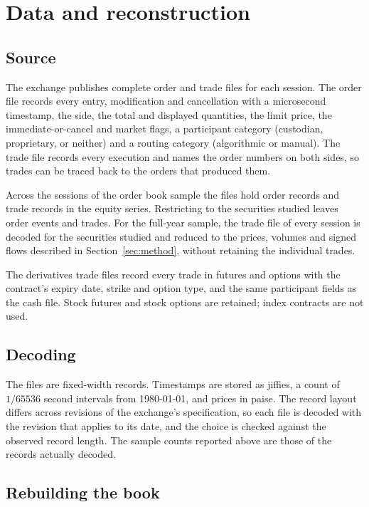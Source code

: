 \section{Data and reconstruction}\label{sec:data}

\subsection{Source}

The exchange publishes complete order and trade files for each session. The order file
records every entry, modification and cancellation with a microsecond timestamp, the side,
the total and displayed quantities, the limit price, the immediate-or-cancel and market
flags, a participant category (custodian, proprietary, or neither) and a routing category
(algorithmic or manual). The trade file records every execution and names the order numbers
on both sides, so trades can be traced back to the orders that produced them.

Across the \SampleSessionsParsed{} sessions of the order book sample the files hold
\SampleOrderEventsRead{} order records and \SampleTradesRead{} trade records in the equity
series. Restricting to the securities studied leaves \SampleOrderEvents{} order events and
\SampleTrades{} trades. For the full-year sample, the trade file of every session is decoded
for the securities studied and reduced to the prices, volumes and signed flows described in
Section~\ref{sec:method}, without retaining the individual trades.

The derivatives trade files record every trade in futures and options with the contract's
expiry date, strike and option type, and the same participant fields as the cash file. Stock
futures and stock options are retained; index contracts are not used.

\subsection{Decoding}

The files are fixed-width records. Timestamps are stored as jiffies, a count of $1/65536$ second
intervals from 1980-01-01, and prices in paise. The record layout differs across revisions of
the exchange's specification, so each file is decoded with the revision that applies to its
date, and the choice is checked against the observed record length. The sample counts reported
above are those of the records actually decoded.

\subsection{Rebuilding the book}

